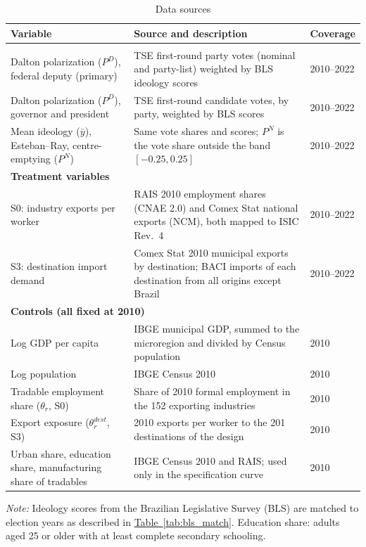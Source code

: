\documentclass[
	11pt,				%
	oneside,			%
	a4paper,			%
	english,			%
	english				%
	]{abntex2ppgsi}
\theoremstyle{plain}
\theoremstyle{remark}
\theoremstyle{plain}%
\theoremstyle{remark}%
\begin{document}
\begin{table}[H]
\centering
\caption{Data sources}
\label{tab:data_sources}
\begin{threeparttable}
\begin{tabularx}{\textwidth}{p{3.5cm} X p{3.0cm}}
\toprule
\textbf{Variable} & \textbf{Source and description} & \textbf{Coverage} \\
\midrule
\addlinespace[0.3em]
\multicolumn{3}{l}{\textbf{Outcome variables}} \\[0.3em]
Dalton polarization ($P^{D}$), federal deputy (primary) & TSE first-round party votes (nominal and party-list) weighted by BLS ideology scores \cite{ZUCCO} & 2010--2022 \\[0.3em]
Dalton polarization ($P^{D}$), governor and president & TSE first-round candidate votes, by party, weighted by BLS scores & 2010--2022 \\[0.3em]
Mean ideology ($\bar{y}$), Esteban--Ray, centre-emptying ($P^{N}$) & Same vote shares and scores; $P^{N}$ is the vote share outside the band $[-0.25, 0.25]$ & 2010--2022 \\[0.5em]
\multicolumn{3}{l}{\textbf{Treatment variables}} \\[0.3em]
S0: industry exports per worker & RAIS 2010 employment shares (CNAE 2.0) and Comex Stat national exports (NCM), both mapped to ISIC Rev.~4 & 2010--2022 \\[0.3em]
S3: destination import demand & Comex Stat 2010 municipal exports by destination; BACI imports of each destination from all origins except Brazil & 2010--2022 \\[0.5em]
\multicolumn{3}{l}{\textbf{Controls (all fixed at 2010)}} \\[0.3em]
Log GDP per capita & IBGE municipal GDP, summed to the microregion and divided by Census population & 2010 \\[0.3em]
Log population & IBGE Census 2010 & 2010 \\[0.3em]
Tradable employment share ($\theta_r$, S0) & Share of 2010 formal employment in the 152 exporting industries & 2010 \\[0.3em]
Export exposure ($\theta^{dest}_r$, S3) & 2010 exports per worker to the 201 destinations of the design & 2010 \\[0.3em]
Urban share, education share, manufacturing share of tradables & IBGE Census 2010 and RAIS; used only in the specification curve & 2010 \\[0.3em]
\bottomrule
\end{tabularx}
\begin{tablenotes}[flushleft]
\footnotesize
\item \textit{Note:} Ideology scores from the Brazilian Legislative Survey (BLS) are matched to election
years as described in \hyperref[tab:bls_match]{Table~\ref{tab:bls_match}}. Education share: adults aged 25 or older with at least complete secondary schooling.
\end{tablenotes}
\end{threeparttable}
\end{table}
\end{document}
